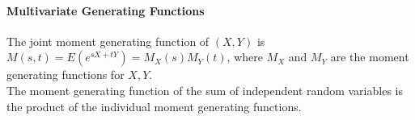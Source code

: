 \documentclass[10pt,letter]{article}
\begin{document}
\paragraph{Multivariate Generating Functions}
The joint moment generating function of $(X,Y)$ is $M(s,t)=E(e^{sX+tY})=M_X(s)M_Y(t)$, where $M_X$ and $M_Y$ are the moment generating functions for $X,Y$. \\ 
The moment generating function of the sum of independent random variables is the product of the individual moment generating functions. 
\end{document}
